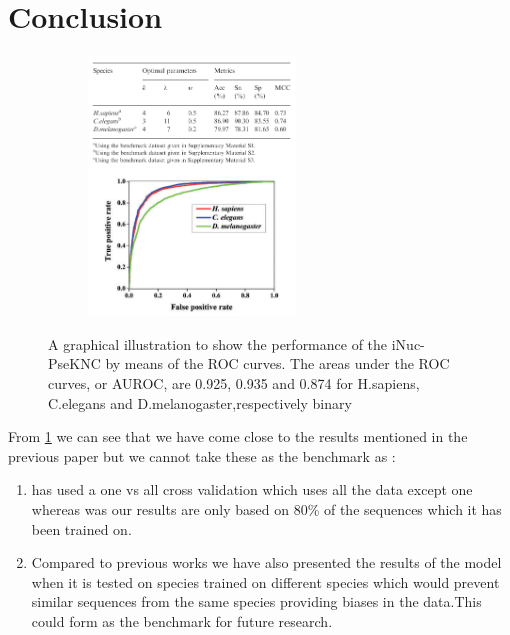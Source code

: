 \documentclass{article}
\begin{document}
\section{Conclusion}
\begin{figure}[H]
  \centering
  \begin{subfigure}{5.5cm}
    \centering\includegraphics[width=5.5cm]{previous_results.png}
  \end{subfigure}
  \caption{A graphical illustration to show the performance of the iNuc- PseKNC by means of the ROC curves. The areas under the ROC curves, or AUROC, are 0.925, 0.935 and 0.874 for H.sapiens, C.elegans and D.melanogaster,respectively
  binary}
 \label{fig:previous_results}
\end{figure}

From \ref{fig:previous_results} we can see that we have come close to the results mentioned in the previous paper but we cannot take these as the benchmark as :
\begin{enumerate}
  \item \citep{Guo1093bioinformaticsbtu083-ss} has used a one vs all cross validation which uses all the data except one whereas was our results are only based on 80\% of the sequences which it has been trained on.
  \item Compared to previous works we have also presented the results of the model when it is tested on species trained on different species which would prevent similar sequences from the same species providing biases in the data.This could form as the benchmark for future research.
\end{enumerate}


\end{document}
